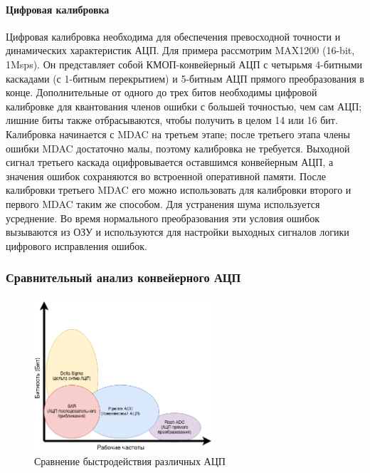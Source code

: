 \documentclass[a4paper,12pt]{article} %
\begin{document}
\paragraph{Цифровая калибровка}
Цифровая калибровка необходима для обеспечения превосходной точности и динамических характеристик АЦП. Для примера рассмотрим MAX1200 (16-bit, 1Msps). Он представляет собой КМОП-конвейерный АЦП с четырьмя 4-битными каскадами (с 1-битным перекрытием) и 5-битным АЦП прямого преобразования в конце. Дополнительные от одного до трех битов необходимы цифровой калибровке для квантования членов ошибки с большей точностью, чем сам АЦП; лишние биты также отбрасываются, чтобы получить в целом 14 или 16 бит. Калибровка начинается с MDAC на третьем этапе; после третьего этапа члены ошибки MDAC достаточно малы, поэтому калибровка не требуется. Выходной сигнал третьего каскада оцифровывается оставшимся конвейерным АЦП, а значения ошибок сохраняются во встроенной оперативной памяти. После калибровки третьего MDAC его можно использовать для калибровки второго и первого MDAC таким же способом. Для устранения шума используется усреднение. Во время нормального преобразования эти условия ошибок вызываются из ОЗУ и используются для настройки выходных сигналов логики цифрового исправления ошибок. 




\subsubsection{Сравнительный анализ конвейерного АЦП }

\begin{figure}[H]
    \centering
    \includegraphics[width=0.6\textwidth]{ADCs.png}
    \caption{Сравнение быстродействия различных АЦП}
    \label{pic:ADCs}
\end{figure}
\end{document}
